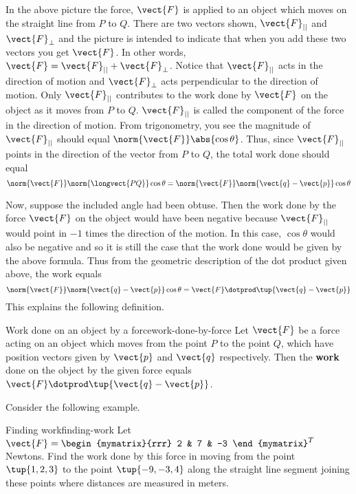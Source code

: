 In the above picture the force, $\vect{F}$ is applied to an object which moves
on the straight line from $P$ to $Q$. There are two vectors shown, $\vect{F}_{||}$ and $\vect{F}_{\bot }$ and the
picture is intended to indicate that when you add these two vectors you get 
$\vect{F}$. In other words, $\vect{F} = \vect{F}_{||} + \vect{F}_{\bot}$. Notice that
 $\vect{F}_{||}$ acts in the direction of motion and 
$\vect{F}_{\bot }$ acts perpendicular to the direction of motion. Only 
$\vect{F}_{||}$ contributes to the work done by $\vect{F}$ on the object
as it moves from $P$ to $Q$. $\vect{F}_{||}$ is
called the component of the force in
 the direction of motion. From trigonometry, you
see the magnitude of $\vect{F}_{||}$ should equal $\norm{\vect{F}
} \abs{\cos \theta} $. Thus, since $\vect{F}_{||}$ points
in the direction of the vector from $P$ to $Q$,
the total work done should equal
\begin{equation*}
\norm{\vect{F}} \norm{
\longvect{PQ}} \cos \theta =\norm{
\vect{F}} \norm{\vect{q}-\vect{p}} \cos \theta
\end{equation*}

Now, suppose the included angle had been obtuse. Then the work done by the force 
$\vect{F}$ on the object would have been negative because $\vect{F}_{||}$
would point in $-1$ times the direction of the motion.  In this case, $\cos \theta $ would also be negative and 
so it is still
the case that the work done would be given by the above formula. Thus from
the geometric description of the dot product given above, the work equals
\begin{equation*}
\norm{\vect{F}} \norm{\vect{q}-\vect{p}} \cos
\theta =\vect{F}\dotprod \tup{\vect{q}-\vect{p}} 
\end{equation*}
This explains the following definition.

\begin{definition}{Work done on an object by a force}{work-done-by-force}
Let $\vect{F}$ be a force acting on an object which moves from the point 
$P$ to the point $Q$, which have position vectors given by $\vect{p}$ and $\vect{q}$ respectively.
 Then the \textbf{work} done
 on the object by the given force equals $\vect{F}\dotprod \tup{
\vect{q}-\vect{p}} $.
\end{definition}

Consider the following example.

\begin{example}{Finding work}{finding-work}
Let $\vect{F}=
\begin{mymatrix}{rrr}
2 & 7 & -3
\end{mymatrix}^T$ Newtons. Find the work
done by this force in moving from the point $\tup{1,2,3} $ to the
point $\tup{-9,-3,4} $ along the straight line segment joining these
points where distances are measured in meters.
\end{example}

